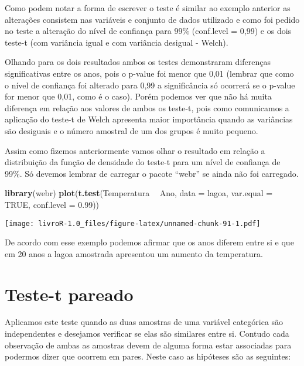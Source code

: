 \documentclass[]{book}
\newenvironment{Shaded}{\begin{snugshade}}{\end{snugshade}}
\newcommand{\DataTypeTok}[1]{\textcolor[rgb]{0.13,0.29,0.53}{#1}}
\newcommand{\FloatTok}[1]{\textcolor[rgb]{0.00,0.00,0.81}{#1}}
\newcommand{\KeywordTok}[1]{\textcolor[rgb]{0.13,0.29,0.53}{\textbf{#1}}}
\newcommand{\NormalTok}[1]{#1}
\newcommand{\OperatorTok}[1]{\textcolor[rgb]{0.81,0.36,0.00}{\textbf{#1}}}
\newcommand{\OtherTok}[1]{\textcolor[rgb]{0.56,0.35,0.01}{#1}}
\newcommand{\StringTok}[1]{\textcolor[rgb]{0.31,0.60,0.02}{#1}}
\begin{document}
Como podem notar a forma de escrever o teste é similar ao exemplo anterior as alterações consistem nas variáveis e conjunto de dados utilizado e como foi pedido no teste a alteração do nível de confiança para 99\% (conf.level = 0,99) e os dois teste-t (com variância igual e com variância desigual - Welch).

Olhando para os dois resultados ambos os testes demonstraram diferenças significativas entre os anos, pois o p-value foi menor que 0,01 (lembrar que como o nível de confiança foi alterado para 0,99 a significância só ocorrerá se o p-value for menor que 0,01, como é o caso). Porém podemos ver que não há muita diferença em relação aos valores de ambos os teste-t, pois como comunicamos a aplicação do teste-t de Welch apresenta maior importância quando as variâncias são desiguais e o número amostral de um dos grupos é muito pequeno.

Assim como fizemos anteriormente vamos olhar o resultado em relação a distribuição da função de densidade do teste-t para um nível de confiança de 99\%. Só devemos lembrar de carregar o pacote ``webr'' se ainda não foi carregado.

\begin{Shaded}
\begin{Highlighting}[]
\KeywordTok{library}\NormalTok{(webr)}
\KeywordTok{plot}\NormalTok{(}\KeywordTok{t.test}\NormalTok{(Temperatura }\OperatorTok{~}\StringTok{ }\NormalTok{Ano, }
            \DataTypeTok{data =}\NormalTok{ lagoa,}
            \DataTypeTok{var.equal =} \OtherTok{TRUE}\NormalTok{,}
            \DataTypeTok{conf.level =} \FloatTok{0.99}\NormalTok{))}
\end{Highlighting}
\end{Shaded}

\texttt{[image: livroR-1.0\_files/figure-latex/unnamed-chunk-91-1.pdf]}

De acordo com esse exemplo podemos afirmar que os anos diferem entre si e que em 20 anos a lagoa amostrada apresentou um aumento da temperatura.

\hypertarget{teste-t-pareado}{%
\section{Teste-t pareado}\label{teste-t-pareado}}

Aplicamos este teste quando as duas amostras de uma variável categórica são independentes e desejamos verificar se elas são similares entre si. Contudo cada observação de ambas as amostras devem de alguma forma estar associadas para podermos dizer que ocorrem em pares. Neste caso as hipóteses são as seguintes:
\end{document}
